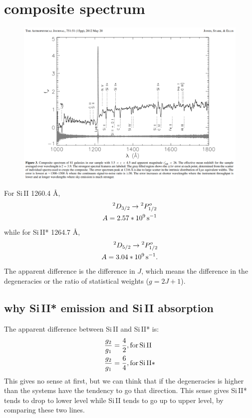\documentclass[12pt,letterpaper]{article}
\newcommand{\hz}{\textrm{\,s}^{-1}}
\newcommand{\siii}{\textrm{Si\,II}}
\begin{document}
\section{composite spectrum}

\begin{figure}[H]
    \centering
    \includegraphics[width=\textwidth]{images/composite_spec.png}
\end{figure}

For {\siii} 1260.4 {\AA},
\begin{equation*}
    \begin{split}
        {^2}D_{3/2} \rightarrow {^2}P^o_{1/2}\\
        A = 2.57 * 10^9 \hz
    \end{split}
\end{equation*}
while for {\siii}* 1264.7 {\AA},
\begin{equation*}
    \begin{split}
        {^2}D_{5/2} \rightarrow {^2}P^o_{1/2}\\
        A = 3.04 * 10^9 \hz.
    \end{split}
\end{equation*}
The apparent difference is the difference in $J$, which means the difference in the degeneracies or the ratio of statistical weights ($g = 2J+1$). 

\subsection{why {\siii}* emission and {\siii} absorption}
The apparent difference between {\siii} and {\siii}* is:
\begin{equation*}
    \begin{split}
        \frac{g_2}{g_1} &= \frac{4}{2}, \textrm{for\,} \siii\\
        \frac{g_2}{g_1} &= \frac{6}{4}, \textrm{for\,} \siii *
    \end{split}
\end{equation*}
This gives no sense at first, but we can think that if the degeneracies is higher than the systems have the tendency to go that direction. 
This sense gives {\siii}* tends to drop to lower level while {\siii} tends to go up to upper level, by comparing these two lines.
\end{document}
